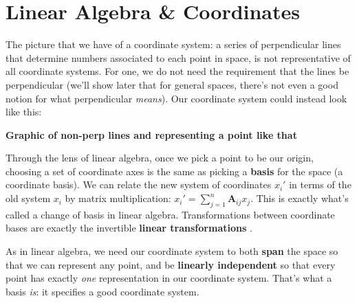 \documentclass[../master.tex]{subfiles}
\begin{document}
	
	
	
	\section{Linear Algebra \& Coordinates} 
	\label{sec:Linear Algebra & Coordinates}%
	
	The picture that we have of a coordinate system: a series of perpendicular lines that determine numbers associated to each point in space, is not representative of all coordinate systems. For one, we do not need the requirement that the lines be perpendicular (we'll show later that for general spaces, there's not even a good notion for what perpendicular \emph{means}). Our coordinate system could instead look like this:
	
	\textbf{Graphic of non-perp lines and representing a point like that}
	
	Through the lens of linear algebra, once we pick a point to be our origin, choosing a set of coordinate axes is the same as picking a \textbf{basis} for the space (a coordinate basis). We can relate the new system of coordinates $x_i'$ in terms of the old system $x_i$ by matrix multiplication: $x_i' = \sum_{j=1}^n \mathbf A_{ij} x_j$. This is exactly what's called a change of basis in linear algebra. Transformations between coordinate bases are exactly the invertible \textbf{linear transformations} .
	
	As in linear algebra, we need our coordinate system to both \textbf{span} the space so that we can represent any point, and be \textbf{linearly independent} so that every point has exactly \emph{one} representation in our coordinate system. That's what a basis \emph{is}: it specifies a good coordinate system. 
	
\end{document}
